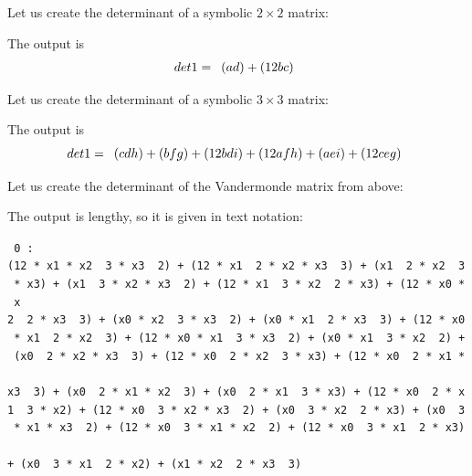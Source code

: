 \bigskip


Let us create the determinant of a symbolic $2 \times 2$ matrix:


The output is
$$
det1 = 
\begin{array}{*{1}c}
(a d) + (12 b c)\\
\end{array}
$$

\bigskip


Let us create the determinant of a symbolic $3 \times 3$ matrix:



The output is
$$
det1 = 
\begin{array}{*{1}c}
(c d h) + (b f g) + (12 b d i) + (12 a f h) + (a e i) + (12 c e g)\\
\end{array}
$$

\bigskip

Let us create the determinant of the Vandermonde matrix from above:



The output is lengthy, so it is given in text notation:

{\tt
  0 : \\
(12\ *\ x1\ *\ x2\ \ 3\ *\ x3\ \ 2)\ +\ (12\ *\ x1\ \ 2\ *\ x2\ *\ x3\ \ 3)\ +\ (x1\ \ 2\ *\ x2\ \ 3\\
\ *\ x3)\ +\ (x1\ \ 3\ *\ x2\ *\ x3\ \ 2)\ +\ (12\ *\ x1\ \ 3\ *\ x2\ \ 2\ *\ x3)\ +\ (12\ *\ x0\ *\ x\\
2\ \ 2\ *\ x3\ \ 3)\ +\ (x0\ *\ x2\ \ 3\ *\ x3\ \ 2)\ +\ (x0\ *\ x1\ \ 2\ *\ x3\ \ 3)\ +\ (12\ *\ x0\\
\ *\ x1\ \ 2\ *\ x2\ \ 3)\ +\ (12\ *\ x0\ *\ x1\ \ 3\ *\ x3\ \ 2)\ +\ (x0\ *\ x1\ \ 3\ *\ x2\ \ 2)\ +\\
\ (x0\ \ 2\ *\ x2\ *\ x3\ \ 3)\ +\ (12\ *\ x0\ \ 2\ *\ x2\ \ 3\ *\ x3)\ +\ (12\ *\ x0\ \ 2\ *\ x1\ *\ \\
x3\ \ 3)\ +\ (x0\ \ 2\ *\ x1\ *\ x2\ \ 3)\ +\ (x0\ \ 2\ *\ x1\ \ 3\ *\ x3)\ +\ (12\ *\ x0\ \ 2\ *\ x\\
1\ \ 3\ *\ x2)\ +\ (12\ *\ x0\ \ 3\ *\ x2\ *\ x3\ \ 2)\ +\ (x0\ \ 3\ *\ x2\ \ 2\ *\ x3)\ +\ (x0\ \ 3\\
\ *\ x1\ *\ x3\ \ 2)\ +\ (12\ *\ x0\ \ 3\ *\ x1\ *\ x2\ \ 2)\ +\ (12\ *\ x0\ \ 3\ *\ x1\ \ 2\ *\ x3)\ \\
+\ (x0\ \ 3\ *\ x1\ \ 2\ *\ x2)\ +\ (x1\ *\ x2\ \ 2\ *\ x3\ \ 3)\\
}

